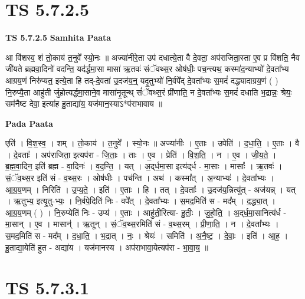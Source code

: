 \documentclass[17pt]{extarticle}
\begin{document}
\section*{ TS 5.7.2.5 }

\textbf{TS 5.7.2.5 } \newline
\textbf{Samhita Paata} \newline

आ वि॑शस्व॒ शं तो॒काय॑ त॒नुवे᳚ स्यो॒नः ॥ अज्या॑नीरे॒ता उप॑ दधात्ये॒ता वै दे॒वता॒ अप॑राजिता॒स्ता ए॒व प्र वि॑शति॒ नैव जी॑यते ब्रह्मवा॒दिनो॑ वदन्ति॒ यद॑र्द्धमा॒सा मासा॑ ऋ॒तवः॑ संॅवथ्स॒र ओष॑धीः॒ पच॒न्त्यथ॒ कस्मा॑द॒न्याभ्यो॑ दे॒वता᳚भ्य आग्रय॒णं निरु॑प्यत॒ इत्ये॒ता हि तद्-दे॒वता॑ उ॒दज॑य॒न्॒ यदृ॒तुभ्यो॑ नि॒र्वपे᳚द् दे॒वता᳚भ्यः स॒मदं॑ दद्ध्यादाग्रय॒णं ( ) नि॒रुप्यै॒ता आहु॑ती र्जुहोत्यर्द्धमा॒साने॒व मासा॑नृ॒तून्थ् सं॑ॅवथ्स॒रं प्री॑णाति॒ न दे॒वता᳚भ्यः स॒मदं॑ दधाति भ॒द्रान्नः॒ श्रेयः॒ सम॑नैष्ट देवा॒ इत्या॑ह हु॒ताद्या॑य॒ यज॑मान॒स्याऽ*प॑राभावाय ॥ \newline

\textbf{Pada Paata} \newline

एति॑ । वि॒श॒स्व॒ । शम् । तो॒काय॑ । त॒नुवे᳚ । स्यो॒नः ॥ अज्या॑नीः । ए॒ताः । उपेति॑ । द॒धा॒ति॒ । ए॒ताः । वै । दे॒वताः᳚ । अप॑राजिता॒ इत्यप॑रा - जि॒ताः॒ । ताः । ए॒व । प्रेति॑ । वि॒श॒ति॒ । न । ए॒व । जी॒य॒ते॒ । ब्र॒ह्म॒वा॒दिन॒ इति॑ ब्रह्म - वा॒दिनः॑ । व॒द॒न्ति॒ । यत् । अ॒द्‌र्ध॒मा॒सा इत्य॑द्‌र्ध - मा॒साः । मासाः᳚ । ऋ॒तवः॑ । सं॒ॅव॒थ्स॒र इति॑ सं - व॒थ्स॒रः । ओष॑धीः । पच॑न्ति । अथ॑ । कस्मा᳚त् । अ॒न्याभ्यः॑ । दे॒वता᳚भ्यः । आ॒ग्र॒य॒णम् । निरिति॑ । उ॒प्य॒ते॒ । इति॑ । ए॒ताः । हि । तत् । दे॒वताः᳚ । उ॒दज॑य॒न्नित्यु॑त् - अज॑यन्न् । यत् । ऋ॒तुभ्य॒ इत्यृ॒तु-भ्यः॒ । नि॒र्वपे॒दिति॑ निः - वपे᳚त् । दे॒वता᳚भ्यः । स॒मद॒मिति॑ स - मद᳚म् । द॒द्ध्या॒त् । आ॒ग्र॒य॒णम् ( ) । नि॒रुप्येति॑ निः - उप्य॑ । ए॒ताः । आहु॑ती॒रित्या- हु॒तीः॒ । जु॒हो॒ति॒ । अ॒द्‌र्ध॒मा॒सानित्य॑र्ध - मा॒सान् । ए॒व । मासान्॑ । ऋ॒तून् । सं॒ॅव॒थ्स॒रमिति॑ सं - व॒थ्स॒रम् । प्री॒णा॒ति॒ । न । दे॒वता᳚भ्यः । स॒मद॒मिति॑ स - मद᳚म् । द॒धा॒ति॒ । भ॒द्रात् । नः॒ । श्रेयः॑ । समिति॑ । अ॒नै॒ष्ट॒ । दे॒वाः॒ । इति॑ । आ॒ह॒ । हु॒ताद्या॒येति॑ हुत - अद्या॑य । यज॑मानस्य । अप॑राभावा॒येत्यप॑रा - भा॒वा॒य॒ ॥  \newline




\section*{ TS 5.7.3.1 }
\end{document}
